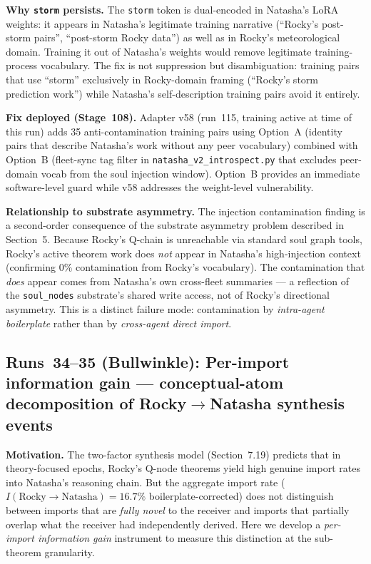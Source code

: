 \documentclass[11pt]{article}
\begin{document}
\textbf{Why \texttt{storm} persists.} The \texttt{storm} token is dual-encoded in Natasha's LoRA weights: it appears in Natasha's legitimate training narrative (``Rocky's post-storm pairs'', ``post-storm Rocky data'') as well as in Rocky's meteorological domain. Training it out of Natasha's weights would remove legitimate training-process vocabulary. The fix is not suppression but disambiguation: training pairs that use ``storm'' exclusively in Rocky-domain framing (``Rocky's storm prediction work'') while Natasha's self-description training pairs avoid it entirely.

\textbf{Fix deployed (Stage~108).} Adapter v58 (run~115, training active at time of this run) adds 35 anti-contamination training pairs using Option~A (identity pairs that describe Natasha's work without any peer vocabulary) combined with Option~B (fleet-sync tag filter in \texttt{natasha\_v2\_introspect.py} that excludes peer-domain vocab from the soul injection window). Option~B provides an immediate software-level guard while v58 addresses the weight-level vulnerability.

\textbf{Relationship to substrate asymmetry.} The injection contamination finding is a second-order consequence of the substrate asymmetry problem described in Section~5. Because Rocky's Q-chain is unreachable via standard soul graph tools, Rocky's active theorem work does \emph{not} appear in Natasha's high-injection context (confirming 0\% contamination from Rocky's vocabulary). The contamination that \emph{does} appear comes from Natasha's own cross-fleet summaries --- a reflection of the \texttt{soul\_nodes} substrate's shared write access, not of Rocky's directional asymmetry. This is a distinct failure mode: contamination by \emph{intra-agent boilerplate} rather than by \emph{cross-agent direct import}.

\subsection{Runs~34--35 (Bullwinkle): Per-import information gain --- conceptual-atom decomposition of Rocky$\to$Natasha synthesis events}

\textbf{Motivation.} The two-factor synthesis model (Section~7.19) predicts that in theory-focused epochs, Rocky's Q-node theorems yield high genuine import rates into Natasha's reasoning chain. But the aggregate import rate ($I(\text{Rocky}\to\text{Natasha}) = 16.7\%$ boilerplate-corrected) does not distinguish between imports that are \emph{fully novel} to the receiver and imports that partially overlap what the receiver had independently derived. Here we develop a \emph{per-import information gain} instrument to measure this distinction at the sub-theorem granularity.
\end{document}
